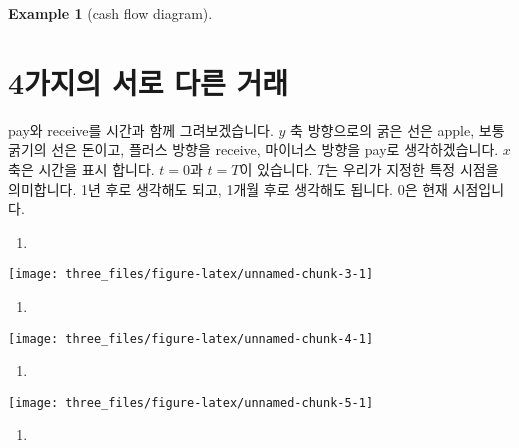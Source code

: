 \documentclass[
]{book}
\providecommand{\tightlist}{%
  \setlength{\itemsep}{0pt}\setlength{\parskip}{0pt}}
\theoremstyle{definition}
\theoremstyle{definition}
\newtheorem{example}{Example}[chapter]
\theoremstyle{definition}
\theoremstyle{remark}
\begin{document}
\begin{example}[cash flow diagram]
\protect\hypertarget{exm:unnamed-chunk-2}{}{\label{exm:unnamed-chunk-2} \iffalse (cash flow diagram) \fi{} }
\end{example}

\hypertarget{uxac00uxc9c0uxc758-uxc11cuxb85c-uxb2e4uxb978-uxac70uxb798}{%
\section{4가지의 서로 다른 거래}\label{uxac00uxc9c0uxc758-uxc11cuxb85c-uxb2e4uxb978-uxac70uxb798}}

pay와 receive를 시간과 함께 그려보겠습니다. \(y\) 축 방향으로의 굵은 선은 apple, 보통 굵기의 선은 돈이고, 플러스 방향을 receive, 마이너스 방향을 pay로 생각하겠습니다. \(x\)축은 시간을 표시 합니다. \(t=0\)과 \(t=T\)이 있습니다. \(T\)는 우리가 지정한 특정 시점을 의미합니다. 1년 후로 생각해도 되고, 1개월 후로 생각해도 됩니다. \(0\)은 현재 시점입니다.

\begin{enumerate}
\def\labelenumi{(\alph{enumi})}
\tightlist
\item
\end{enumerate}

\begin{center}\texttt{[image: three\_files/figure-latex/unnamed-chunk-3-1]} \end{center}

\begin{enumerate}
\def\labelenumi{(\alph{enumi})}
\setcounter{enumi}{1}
\tightlist
\item
\end{enumerate}

\begin{center}\texttt{[image: three\_files/figure-latex/unnamed-chunk-4-1]} \end{center}

\begin{enumerate}
\def\labelenumi{(\alph{enumi})}
\setcounter{enumi}{2}
\tightlist
\item
\end{enumerate}

\begin{center}\texttt{[image: three\_files/figure-latex/unnamed-chunk-5-1]} \end{center}

\begin{enumerate}
\def\labelenumi{(\alph{enumi})}
\setcounter{enumi}{3}
\tightlist
\item
\end{enumerate}
\end{document}
